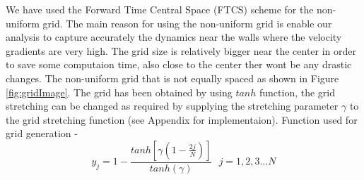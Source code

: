 \documentclass{article}
\begin{document}
We have used the Forward Time Central Space (FTCS) scheme for the non-uniform grid. The main reason for using the non-uniform grid is enable our analysis to capture accurately the dynamics near the walls where the velocity gradients are very high. The grid size is relatively bigger near the center in order to save some computaion time, also close to the center ther wont be any drastic changes. The non-uniform grid that is not equally spaced as shown in Figure \ref{fig:gridImage}. The grid has been obtained by using $tanh$ function, the grid stretching can be changed as required by supplying the stretching parameter $\gamma$ to the grid stretching function (see Appendix for implementaion). Function used for grid generation -  
\begin{equation}
y_j = 1- \frac{tanh\left[\gamma\left(1-\frac{2j}{N}\right)\right]}{tanh(\gamma)} \text{   }  j =1,2,3 \dots N
\end{equation}
\end{document}
